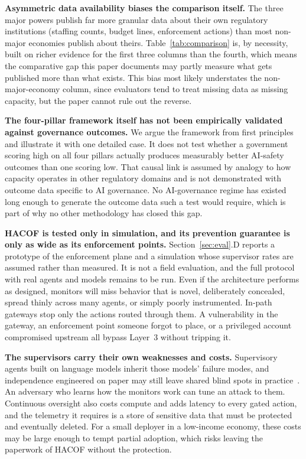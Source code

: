 \documentclass[journal]{IEEEtran}
\newcommand{\hacof}{HACOF}
\begin{document}
\textbf{Asymmetric data availability biases the comparison itself.} The three major powers publish far more granular data about their own regulatory institutions (staffing counts, budget lines, enforcement actions) than most non-major economies publish about theirs. Table~\ref{tab:comparison} is, by necessity, built on richer evidence for the first three columns than the fourth, which means the comparative gap this paper documents may partly measure what gets published more than what exists. This bias most likely understates the non-major-economy column, since evaluators tend to treat missing data as missing capacity, but the paper cannot rule out the reverse.

\textbf{The four-pillar framework itself has not been empirically validated against governance outcomes.} We argue the framework from first principles and illustrate it with one detailed case. It does not test whether a government scoring high on all four pillars actually produces measurably better AI-safety outcomes than one scoring low. That causal link is assumed by analogy to how capacity operates in other regulatory domains and is not demonstrated with outcome data specific to AI governance. No AI-governance regime has existed long enough to generate the outcome data such a test would require, which is part of why no other methodology has closed this gap.

\textbf{\hacof{} is tested only in simulation, and its prevention guarantee is only as wide as its enforcement points.} Section~\ref{sec:eval}.D reports a prototype of the enforcement plane and a simulation whose supervisor rates are assumed rather than measured. It is not a field evaluation, and the full protocol with real agents and models remains to be run. Even if the architecture performs as designed, monitors will miss behavior that is novel, deliberately concealed, spread thinly across many agents, or simply poorly instrumented. In-path gateways stop only the actions routed through them. A vulnerability in the gateway, an enforcement point someone forgot to place, or a privileged account compromised upstream all bypass Layer~3 without tripping it.

\textbf{The supervisors carry their own weaknesses and costs.} Supervisory agents built on language models inherit those models' failure modes, and independence engineered on paper may still leave shared blind spots in practice~\cite{kim2025correlated}.
An adversary who learns how the monitors work can tune an attack to them. Continuous oversight also costs compute and adds latency to every gated action, and the telemetry it requires is a store of sensitive data that must be protected and eventually deleted. For a small deployer in a low-income economy, these costs may be large enough to tempt partial adoption, which risks leaving the paperwork of \hacof{} without the protection.
\end{document}
